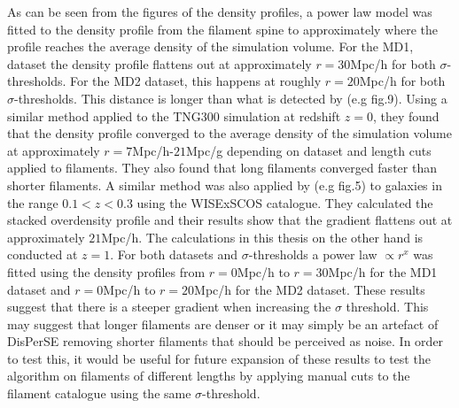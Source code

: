 As can be seen from the figures of the density profiles, a power law model was fitted to the density profile from the filament spine to approximately where the profile reaches the average density of the simulation volume. For the MD1, dataset the density profile flattens out at approximately $r=30$Mpc/h for both $\sigma$-thresholds. For the MD2 dataset, this happens at roughly $r=20$Mpc/h for both $\sigma$-thresholds. This distance is longer than what is detected by \cite{Gal_rraga_Espinosa_2020} (e.g fig.9). Using a similar method applied to the TNG300 simulation\cite{nelson2021illustristng} at redshift $z=0$, they found that the density profile converged to the average density of the simulation volume at approximately $r=7$Mpc/h-$21$Mpc/g depending on dataset and length cuts applied to filaments. They also found that long filaments converged faster than shorter filaments. A similar method was also applied by \cite{bonjean} (e.g fig.5) to galaxies in the range $0.1<z<0.3$ using the WISExSCOS catalogue\cite{Bilicki_2016}. They calculated the stacked overdensity profile and their results show that the gradient flattens out at approximately $21$Mpc/h. The calculations in this thesis on the other hand is conducted at $z=1$. For both datasets and $\sigma$-thresholds a power law $\propto r^x$ was fitted using the density profiles from $r=0$Mpc/h to $r=30$Mpc/h for the MD1 dataset and $r=0$Mpc/h to $r=20$Mpc/h for the MD2 dataset. These results suggest that there is a steeper gradient when increasing the $\sigma$ threshold. This may suggest that longer filaments are denser or it may simply be an artefact of DisPerSE removing shorter filaments that should be perceived as noise. In order to test this, it would be useful for future expansion of these results to test the algorithm on filaments of different lengths by applying manual cuts to the filament catalogue using the same $\sigma$-threshold.\\\indent

